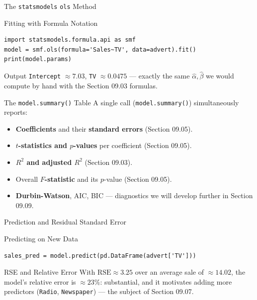 \documentclass[10pt, aspectratio=169]{beamer}
\begin{document}
\begin{frame}[fragile]{The \texttt{statsmodels} \texttt{ols} Method}
  \footnotesize
  \begin{block}{Fitting with Formula Notation}
    \begin{verbatim}
import statsmodels.formula.api as smf
model = smf.ols(formula='Sales~TV', data=advert).fit()
print(model.params)
    \end{verbatim}
  \end{block}
  \pause

  \vspace{0.1cm}
  \begin{alertblock}{Output}
    \texttt{Intercept} $\approx7.03$, \texttt{TV} $\approx0.0475$ --- exactly the same $\hat\alpha,\hat\beta$ we would compute by hand with the Section 09.03 formulas.
  \end{alertblock}
\end{frame}

\begin{frame}{The \texttt{model.summary()} Table}
  \footnotesize
  A single call (\texttt{model.summary()}) simultaneously reports:
  \begin{itemize}\itemsep=0.08cm
    \item \textbf{Coefficients} and their \textbf{standard errors} (Section 09.05). \pause
    \item \textbf{$t$-statistics and $p$-values} per coefficient (Section 09.05). \pause
    \item \textbf{$R^2$ and adjusted $R^2$} (Section 09.03). \pause
    \item Overall \textbf{$F$-statistic} and its $p$-value (Section 09.05). \pause
    \item \textbf{Durbin-Watson}, AIC, BIC --- diagnostics we will develop further in Section 09.09.
  \end{itemize}
\end{frame}

\begin{frame}[fragile]{Prediction and Residual Standard Error}
  \footnotesize
  \begin{block}{Predicting on New Data}
    \begin{verbatim}
sales_pred = model.predict(pd.DataFrame(advert['TV']))
    \end{verbatim}
  \end{block}
  \pause

  \vspace{0.1cm}
  \begin{alertblock}{RSE and Relative Error}
    With $\text{RSE}\approx3.25$ over an average sale of $\approx14.02$, the model's relative error is $\approx23\%$: substantial, and it motivates adding more predictors (\texttt{Radio}, \texttt{Newspaper}) --- the subject of Section 09.07.
  \end{alertblock}
\end{frame}
\end{document}
